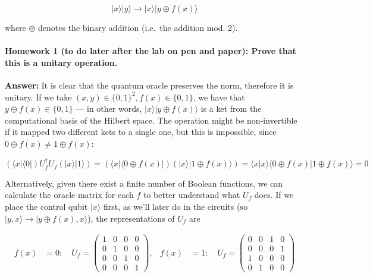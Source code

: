 \documentclass[11pt]{article}
\begin{document}
\[
|x\rangle|y\rangle\to |x\rangle|y\oplus f(x)\rangle
\]

where \(\oplus\) denotes the binary addition (i.e.~the addition mod. 2).

\paragraph{\texorpdfstring{\textbf{Homework 1} (to do later after the
lab on pen and paper): Prove that this is a unitary operation.
}{Homework 1 (to do later after the lab on pen and paper):   Prove that this is a unitary operation. }}\label{homework-1-to-do-later-after-the-lab-on-pen-and-paper-prove-that-this-is-a-unitary-operation.}

\textbf{Answer:} It is clear that the quantum oracle preserves the norm,
therefore it is unitary. If we take
\((x,y)\in\{0,1\}^2, f(x)\in\{0,1\}\), we have that
\(y\oplus f(x)\in\{0,1\}\) --- in other words,
\(|x\rangle|y\oplus f(x)\rangle\) is a ket from the computational basis
of the Hilbert space. The operation might be non-invertible if it mapped
two different kets to a single one, but this is impossible, since
\(0\oplus f(x)\neq 1\oplus f(x)\):

\[
(\langle x|\langle 0|)U_f^\dagger U_f(|x\rangle|1\rangle) =
(\langle x|\langle 0\oplus f(x)|)(|x\rangle|1\oplus f(x)\rangle) = 
\langle x|x\rangle\langle 0\oplus f(x)|1\oplus f(x)\rangle = 0
\]

Alternatively, given there exist a finite number of Boolean functions,
we can calculate the oracle matrix for each \(f\) to better understand
what \(U_f\) does. If we place the control qubit \(|x\rangle\) first, as
we'll later do in the circuits (so
\(|y,x\rangle\rightarrow|y\oplus f(x), x\rangle\)), the representations
of \(U_f\) are

\[
\begin{aligned}
f(x)&=0:\quad
U_f = \begin{pmatrix}
1 & 0 & 0 & 0 \\
0 & 1 & 0 & 0 \\
0 & 0 & 1 & 0 \\
0 & 0 & 0 & 1
\end{pmatrix},
&
f(x)&=1:\quad
U_f = \begin{pmatrix}
0 & 0 & 1 & 0 \\
0 & 0 & 0 & 1 \\
1 & 0 & 0 & 0 \\
0 & 1 & 0 & 0
\end{pmatrix}
\end{aligned}
\]
\end{document}
